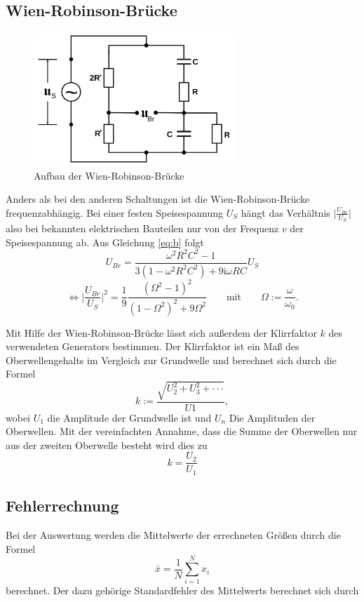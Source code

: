 \subsection{Wien-Robinson-Brücke}
\begin{figure}[H]
\centering
    \includegraphics[height= 5cm]{content/Wien-Robinson.png}
    \caption{Aufbau der Wien-Robinson-Brücke\cite[223]{sample}}
\end{figure}
\noindent Anders als bei den anderen Schaltungen ist
die Wien-Robinson-Brücke frequenzabhängig. Bei einer
festen Speisespannung $U_S$ hängt das Verhältnis
$\lvert{\frac{U_{Br}}{U_S}}\rvert$
also bei bekannten elektrischen Bauteilen
nur von der Frequenz $v$ der Speisespannung ab.
Aus Gleichung \ref{eq:b} folgt
\begin{equation}
    U_{Br}=\frac{\omega^2R^2C^2-1}{3(1-\omega^2R^2C^2)+9\text{i}\omega RC}U_S
\end{equation}
\begin{equation}
    \iff \Big|\frac{U_{Br}}{U_S}\Bigr| ^2=\frac{1}{9}\frac{(\Omega ^2 -1)^2}{(1-\Omega ^2)^2+9\Omega ^2} \qquad \text{mit} \qquad \Omega := \frac{\omega}{\omega_0}.
\end{equation}

\noindent Mit Hilfe der Wien-Robinson-Brücke lässt
sich außerdem der Klirrfaktor $k$ des verwendeten Generators
bestimmen. Der Klirrfaktor ist ein Maß des
Oberwellengehalts im Vergleich zur Grundwelle und berechnet
sich durch die Formel
\begin{equation}
    k:=\frac{\sqrt{U_2^2+U_3^2+\cdot \cdot \cdot }}{U1},
\end{equation}
\noindent wobei $U_1$ die Amplitude der Grundwelle
ist und $U_n$ Die Amplituden der Oberwellen.
Mit der vereinfachten Annahme, dass die Summe der
Oberwellen nur aus der zweiten Oberwelle besteht wird
dies zu
\begin{equation}
    k=\frac{U_2}{U_1}
\end{equation}



\subsection{Fehlerrechnung}
Bei der Auswertung werden die Mittelwerte 
der errechneten Größen durch die Formel
\begin{equation}
    \bar{x}=\frac{1}{N}\sum_{i=1}^N x_i
\end{equation}
berechnet. Der dazu gehörige Standardfehler
des Mittelwerts berechnet sich durch

